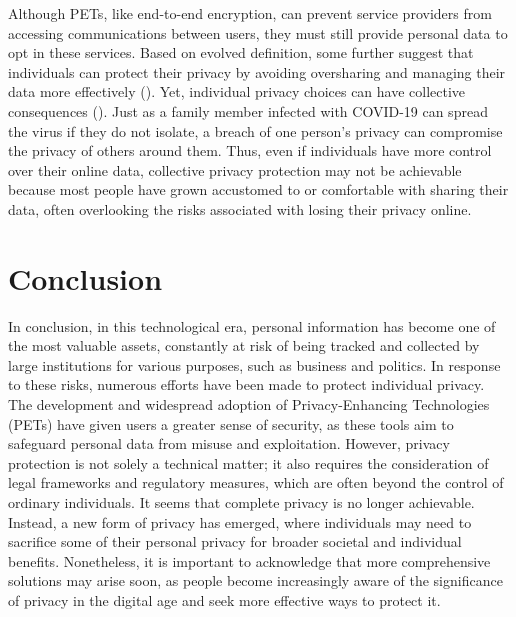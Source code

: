 \documentclass[a4paper,12pt]{article}
\newcommand{\sectionpage}[1]{
  \newpage
  \section{#1}
  \doublespacing
  \singlespacing
}
\begin{document}
Although PETs, like end-to-end encryption, can prevent service providers from accessing communications between users, they must still provide personal data to opt in these services. Based on evolved definition, some further suggest that individuals can protect their privacy by avoiding oversharing and managing their data more effectively (\cite{salem2021privacy}). Yet, individual privacy choices can have collective consequences (\cite{veliz2020privacy}). Just as a family member infected with COVID-19 can spread the virus if they do not isolate, a breach of one person's privacy can compromise the privacy of others around them. Thus, even if individuals have more control over their online data, collective privacy protection may not be achievable because most people have grown accustomed to or comfortable with sharing their data, often overlooking the risks associated with losing their privacy online.


\sectionpage{Conclusion}
\onehalfspacing
In conclusion, in this technological era, personal information has become one of the most valuable assets, constantly at risk of being tracked and collected by large institutions for various purposes, such as business and politics. In response to these risks, numerous efforts have been made to protect individual privacy. The development and widespread adoption of Privacy-Enhancing Technologies (PETs) have given users a greater sense of security, as these tools aim to safeguard personal data from misuse and exploitation. However, privacy protection is not solely a technical matter; it also requires the consideration of legal frameworks and regulatory measures, which are often beyond the control of ordinary individuals. It seems that complete privacy is no longer achievable. Instead, a new form of privacy has emerged, where individuals may need to sacrifice some of their personal privacy for broader societal and individual benefits. Nonetheless, it is important to acknowledge that more comprehensive solutions may arise soon, as people become increasingly aware of the significance of privacy in the digital age and seek more effective ways to protect it.

\newpage

\printbibliography %
\end{document}
